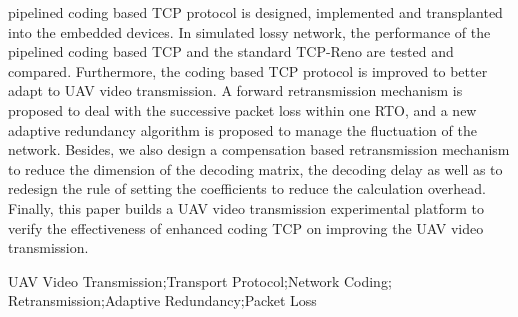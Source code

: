{pipelined coding based TCP protocol is designed, implemented and transplanted into the embedded devices. In simulated lossy network, the performance of the pipelined coding based TCP and the standard TCP-Reno are tested and compared. Furthermore, the coding based TCP protocol is improved to better adapt to UAV video transmission. A forward retransmission mechanism is proposed to deal with the successive packet loss within one RTO, and a new adaptive redundancy algorithm is proposed to manage the fluctuation of the network. Besides, we also design a compensation based retransmission mechanism to reduce the dimension of the decoding matrix, the decoding delay as well as to redesign the rule of setting the coefficients to reduce the calculation overhead. Finally, this paper builds a UAV video transmission experimental platform to verify the effectiveness of enhanced coding TCP on improving the UAV video transmission.

}
{UAV Video Transmission;Transport Protocol;Network Coding; Retransmission;Adaptive Redundancy;Packet Loss}	%